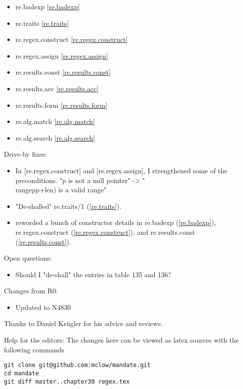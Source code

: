 \begin{itemize}
\item{re.badexp}			\ref{re.badexp}
\item{re.traits}			\ref{re.traits}
\item{re.regex.construct}	\ref{re.regex.construct}
\item{re.regex.assign}		\ref{re.regex.assign}
\item{re.results.const}		\ref{re.results.const}
\item{re.results.acc}		\ref{re.results.acc}
\item{re.results.form}		\ref{re.results.form}
\item{re.alg.match}			\ref{re.alg.match}
\item{re.alg.search}		\ref{re.alg.search}
\end{itemize}

Drive-by fixes:
\begin{itemize}
\item{In [re.regex.construct] and [re.regex.assign], I strengthened some of the preconditions. "p is not a null pointer" -> "\\range{p}{p+len)} is a valid range"}
\item{"De-shalled" re.traits/1 (\ref{re.traits}).}
\item{reworded a bunch of constructor details in re.badexp (\ref{re.badexp}),  re.regex.construct (\ref{re.regex.construct}), and re.results.const (\ref{re.results.const}).}
\end{itemize}

Open questions:
\begin{itemize}
\item{Should I "de-shall" the entries in table 135 and 136?}
\end{itemize}


Changes from R0:
\begin{itemize}
\item{Updated to N4830}
\end{itemize}

Thanks to Daniel Krügler for his advice and reviews.

\vfill
Help for the editors: The changes here can be viewed as latex sources with the following commands
\begin{verbatim}
git clone git@github.com:mclow/mandate.git
cd mandate
git diff master..chapter30 regex.tex
\end{verbatim}
